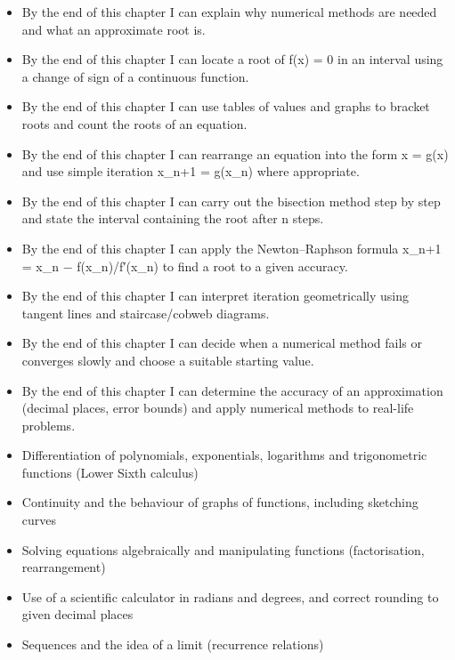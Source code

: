 \documentclass[11pt]{article}
\begin{document}
\begin{objectifs}
\begin{itemize}
\item By the end of this chapter I can explain why numerical methods are needed and what an approximate root is.
\item By the end of this chapter I can locate a root of f(x) = 0 in an interval using a change of sign of a continuous function.
\item By the end of this chapter I can use tables of values and graphs to bracket roots and count the roots of an equation.
\item By the end of this chapter I can rearrange an equation into the form x = g(x) and use simple iteration x\_{n+1} = g(x\_n) where appropriate.
\item By the end of this chapter I can carry out the bisection method step by step and state the interval containing the root after n steps.
\item By the end of this chapter I can apply the Newton–Raphson formula x\_{n+1} = x\_n − f(x\_n)/f′(x\_n) to find a root to a given accuracy.
\item By the end of this chapter I can interpret iteration geometrically using tangent lines and staircase/cobweb diagrams.
\item By the end of this chapter I can decide when a numerical method fails or converges slowly and choose a suitable starting value.
\item By the end of this chapter I can determine the accuracy of an approximation (decimal places, error bounds) and apply numerical methods to real-life problems.
\end{itemize}
\end{objectifs}

\begin{prerequis}
\begin{itemize}
\item Differentiation of polynomials, exponentials, logarithms and trigonometric functions (Lower Sixth calculus)
\item Continuity and the behaviour of graphs of functions, including sketching curves
\item Solving equations algebraically and manipulating functions (factorisation, rearrangement)
\item Use of a scientific calculator in radians and degrees, and correct rounding to given decimal places
\item Sequences and the idea of a limit (recurrence relations)
\end{itemize}
\end{prerequis}
\end{document}
